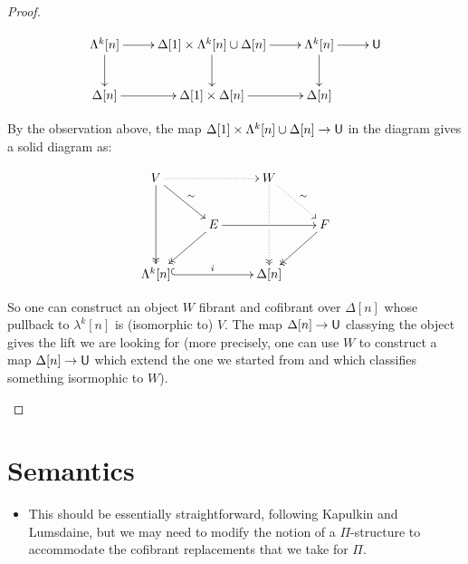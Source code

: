 \documentclass[reqno,10pt,a4paper,oneside,draft]{amsart}
\begin{document}
\begin{proof}
\begin{enumerate}[(i)]
\[\xymatrix{\Lambda^k[n] \ar[d] \ar[r] & \Delta[1] \times \Lambda^k[n] \cup \Delta[n] \ar[d] \ar[r] & \Lambda^k[n] \ar[d] \ar[r] & \U \\
\Delta[n] \ar[r] & \Delta[1] \times \Delta[n] \ar[r] & \Delta[n] 
}\]



By the observation above, the map $\Delta[1] \times \Lambda^k[n] \cup \Delta[n] \rightarrow \mathsf{U}$ in the diagram gives a solid diagram as:

\[ 
\xymatrix{
  V
  \ar@{.>}[rr]
  \ar[dr]^{\sim}
  \ar@{->>}[dd]
&&
  W
  \ar@{.>}[dr]^{\sim}
  \ar@{.>>}[dd]|{\hole}
&\\&
  E
  \ar[rr]
  \ar@{->>}[dl]
&&
  F
  \ar@{->>}[dl]
\\
  \Lambda^k[n]
  \ar@{^{(}->}[rr]^i
&&
  \Delta[n]
&
}
\] 


So one can construct an object $W$ fibrant and cofibrant over $\Delta[n]$ whose pullback to $\lambda^k[n]$ is (isomorphic to) $V$. The map $\Delta[n] \rightarrow \mathsf{U}$ classying the object gives the lift we are looking for (more precisely, one can use $W$ to construct  a map $\Delta[n] \rightarrow \mathsf{U}$ which extend the one we started from and which classifies something isormophic to $W$).


\end{enumerate}

\end{proof}



\newpage

\section{Semantics}


\begin{itemize}
\item This should be essentially straightforward, following Kapulkin and Lumsdaine, but we may need to modify the notion of a $\Pi$-structure to accommodate the cofibrant replacements that we take for $\Pi$.
\end{itemize}

\nocite{*}




\end{document}
